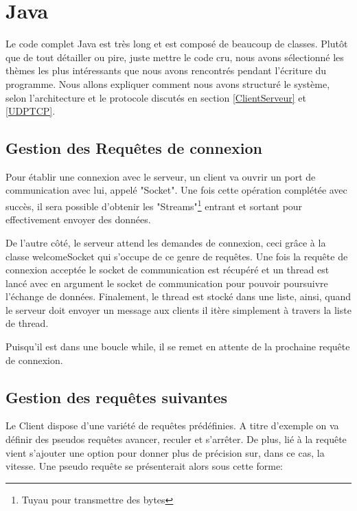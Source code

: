 \documentclass[a4paper,11pt]{report}
\begin{document}
{\section{Java}
Le code complet Java est très long et est composé de beaucoup de classes. Plutôt que de tout détailler ou pire, juste mettre le code cru, nous avons sélectionné les thèmes les plus intéressants que nous avons rencontrés pendant l'écriture du programme. Nous allons expliquer comment nous avons structuré le système, selon l'architecture et le protocole discutés en section \ref{ClientServeur} et \ref{UDPTCP}.

\subsection{Gestion des Requêtes de connexion}
Pour établir une connexion avec le serveur, un client va ouvrir un port de communication avec lui, appelé "Socket". Une fois cette opération complétée avec succès, il sera possible d'obtenir les "Streams"\footnote{Tuyau pour transmettre des bytes} entrant et sortant pour effectivement envoyer des données.



De l'autre côté, le serveur attend les demandes de connexion, ceci grâce à la classe welcomeSocket qui s'occupe de ce genre de requêtes. Une fois la requête de connexion acceptée le socket de communication est récupéré et un thread est lancé avec en argument le socket de communication pour pouvoir poursuivre l'échange de données. Finalement, le thread est stocké dans une liste, ainsi, quand le serveur doit envoyer un message aux clients il itère simplement à travers la liste de thread.

 
 
 Puisqu'il est dans une boucle while, il se remet en attente de la prochaine requête de connexion.
 
 \subsection{Gestion des requêtes suivantes}
 Le Client dispose d'une variété de requêtes prédéfinies. A titre d'exemple on va définir des pseudos requêtes avancer, reculer et s'arrêter. De plus, lié à la requête vient s'ajouter une option pour donner plus de précision sur, dans ce cas, la vitesse. Une pseudo requête se présenterait alors sous cette forme:
 
}
\end{document}
